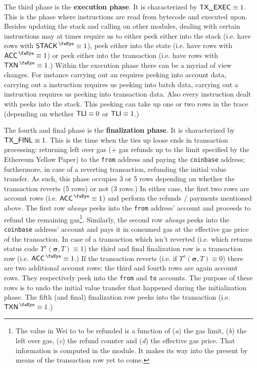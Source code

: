 The third phase is the \textbf{execution phase}.
It is characterized by $\textsf{TX}\textsf{\_EXEC} \equiv 1$. This is the phase where instructions are read from bytecode and executed upon. Besides updating the stack and calling on other modules, dealing with certain instructions may at times require us to either
peek either into the stack (i.e. have rows with $\peekStack \equiv 1$),
peek either into the state (i.e. have rows with $\peekAccount \equiv 1$) or 
peek either into the transaction (i.e. have rows with $\peekTransaction \equiv 1$.)
Within the execution phase there can be a myriad of view changes. For instance carrying out an  requires peeking into account data, carrying out a  instruction requires us peeking into batch data, carrying out a  instruction requires us peeking into transaction data. Also every instruction dealt with peeks into the stack. This peeking can take up one or two rows in the trace (depending on whether $\textsf{TLI} \equiv 0$ or $\textsf{TLI} \equiv 1$.)

The fourth and final phase is the \textbf{finalization phase}.
It is characterized by $\textsf{TX}\textsf{\_FINL} \equiv 1$. This is the time when the \zkEvm{} ties up loose ends in transaction processing: returning left over gas (+ gas refunds up to the limit specified by the Ethereum Yellow Paper) to the \texttt{from} address and paying the \texttt{coinbase} address; furthermore, in case of a reverting transaction, refunding the initial value transfer. As such, this phase occupies 3 or 5 rows depending on whether the transaction reverts (5 rows) or not (3 rows.) In either case, the first two rows are account rows (i.e. $\peekAccount \equiv 1$) and perform the refunds / payments mentioned above. The first row \emph{always} peeks into the \texttt{from} address' account and proceeds to refund the remaining gas\footnote{The value in Wei to to be refunded is a function of
(\emph{a}) the gas limit,
(\emph{b}) the left over gas,
(\emph{c}) the refund counter and 
(\emph{d}) the effective gas price.
That information is computed in the \txnDataMod{} module. It makes its way into the present \hubMod{} by means of the transaction row yet to come.}. Similarly, the second row \emph{always} peeks into the \texttt{coinbase} address' account and pays it in consumed gas at the effective gas price of the transaction. In case of a transaction which isn't reverted (i.e. which returns status code $\Upsilon^{z}(\bm{\sigma}, T) \equiv 1$) the third and final finalization row is a transaction row (i.e. $\peekAccount \equiv 1$.) If the transaction reverts (i.e. if $\Upsilon^{z}(\bm{\sigma}, T) \equiv 0$) there are two additional account rows: the third and fourth rows are again account rows. They respectively peek into the \texttt{from} and \texttt{to} accounts. The purpose of these rows is to undo the initial value transfer that happened during the initialization phase. The fifth (and final) finalization row peeks into the transaction (i.e. $\peekTransaction \equiv 1$.)

